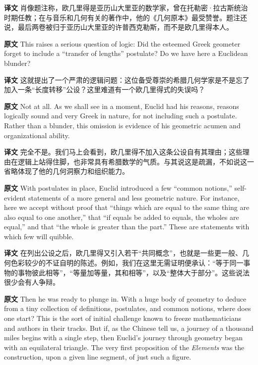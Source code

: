 \documentclass[UTF8,zihao=-4]{ctexart}
\begin{document}
\noindent\textbf{译文} 肖像题注称，欧几里得是亚历山大里亚的数学家，曾在托勒密·拉古斯统治时期任教；在与音乐和几何有关的著作中，他的《几何原本》最受赞誉。题注还说，最后两卷被归于亚历山大里亚的许普西克勒斯，而不是欧几里得本人。

\noindent\textbf{原文} This raises a serious question of logic: Did the esteemed Greek geometer forget to include a ``transfer of lengths'' postulate? Do we have here a Euclidean blunder?

\noindent\textbf{译文} 这就提出了一个严肃的逻辑问题：这位备受尊崇的希腊几何学家是不是忘了加入一条``长度转移''公设？这里难道有一个欧几里得式的失误吗？

\noindent\textbf{原文} Not at all. As we shall see in a moment, Euclid had his reasons, reasons logically sound and very Greek in nature, for not including such a postulate. Rather than a blunder, this omission is evidence of his geometric acumen and organizational ability.

\noindent\textbf{译文} 完全不是。我们马上会看到，欧几里得不加入这条公设自有其理由；这些理由在逻辑上站得住脚，也非常具有希腊数学的气质。与其说这是疏漏，不如说这一省略体现了他的几何洞察力和组织能力。

\noindent\textbf{原文} With postulates in place, Euclid introduced a few ``common notions,'' self-evident statements of a more general and less geometric nature. For instance, here we accept without proof that ``things which are equal to the same thing are also equal to one another,'' that ``if equals be added to equals, the wholes are equal,'' and that ``the whole is greater than the part.'' These are statements with which few will quibble.

\noindent\textbf{译文} 在列出公设之后，欧几里得又引入若干``共同概念''，也就是一些更一般、几何色彩较少的不证自明的陈述。例如，我们在这里无需证明便承认：``等于同一事物的事物彼此相等''，``等量加等量，其和相等''，以及``整体大于部分''。这些说法很少会有人争辩。

\noindent\textbf{原文} Then he was ready to plunge in. With a huge body of geometry to deduce from a tiny collection of definitions, postulates, and common notions, where does one start? This is the sort of initial challenge known to freeze mathematicians and authors in their tracks. But if, as the Chinese tell us, a journey of a thousand miles begins with a single step, then Euclid's journey through geometry began with an equilateral triangle. The very first proposition of the \textit{Elements} was the construction, upon a given line segment, of just such a figure.
\end{document}
